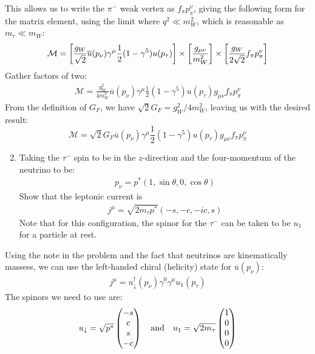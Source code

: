 \documentclass[12pt]{article}
\newcommand{\M}{\mathcal{M}}
\begin{document}
This allows us to write the $\pi^-$ weak vertex as $f_\pi p_\pi^\nu$, giving the following form for the matrix element, using the limit where $q^2\ll m_W^2$, which is reasonable as $m_\tau\ll m_W$:
\begin{align*}
  \M=\qty[\frac{g_W}{\sqrt{2}}
  \overline{u}(p_\nu)\gamma^\mu\frac12(1-\gamma^5)u(p_\tau)]\times
  \qty[\frac{g_{\mu\nu}}{m_W^2}]\times
  \qty[\frac{g_W}{2\sqrt{2}}f_\pi p_\pi^\nu]
\end{align*}
Gather factors of two:
\begin{align*}
  \M=\frac{g_W^2}{4m_W^2}
  \overline{u}(p_\nu)\gamma^\mu\frac12(1-\gamma^5)u(p_\tau)
  g_{\mu\nu}f_\pi p_\pi^\nu
\end{align*}
From the definition of $G_F$, we have $\sqrt{2}G_F=g_W^2/4m_W^2$, leaving us with the desired result:
\begin{equation}
  \label{eq:p5a}
  \boxed{\M=\sqrt{2}G_F
  \overline{u}(p_\nu)\gamma^\mu\frac12(1-\gamma^5)u(p_\tau)
  g_{\mu\nu}f_\pi p_\pi^\nu}
\end{equation}
\begin{problem}
  \begin{enumerate}[label = (\alph*)]
    \setcounter{enumi}{1}
  \item Taking the $\tau^-$ spin to be in the $z$-direction and the four-momentum of the neutrino to be:
    \begin{align*}
      p_\nu=p^*(1,\sin\theta,0,\cos\theta)
    \end{align*}
    Show that the leptonic current is
    \begin{align*}
      j^\mu=\sqrt{2m_\tau p^*}(-s,-c,-ic,s)
    \end{align*}
    Note that for this configuration, the spinor for the $\tau^-$ can be taken to be $u_1$ for a particle at rest.
  \end{enumerate}
\end{problem}
Using the note in the problem and the fact that neutrinos are kinematically massess, we can use the left-handed chiral (helicity) state for $\overline{u}(p_\nu)$:
\begin{align*}
  j^\mu=u^\dag_\downarrow(p_\nu)\gamma^0\gamma^\mu u_1(p_\tau)
\end{align*}
The spinors we need to use are:
\begin{align*}
  u_\downarrow=\sqrt{p^*}\pmqty{-s\\c\\s\\-c}\quad\text{and}\quad
  u_1=\sqrt{2m_\tau}\pmqty{1\\0\\0\\0}
\end{align*}
\end{document}
